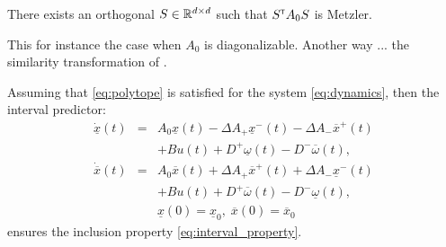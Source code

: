 \documentclass{article}
\begin{document}
\begin{assumption}
There exists an orthogonal $S\in\mathbb{R}^{d\times d}$ such that $S^{\mathsf{\scriptscriptstyle T}} A_0 S$ is Metzler.
\end{assumption}

This for instance the case when $A_0$ is diagonalizable. Another way ... the similarity transformation of \citep{Efimov_a2013}.

\begin{theorem}
\label{thm:predictor}
Assuming that \eqref{eq:polytope} is satisfied for the system \eqref{eq:dynamics}, then the interval predictor:
\begin{eqnarray}
\dot{\underline{x}}(t) & = & A_{0}\underline{x}(t)-\Delta A_{+}\underline{x}^{-}(t)-\Delta A_{-}\overline{x}^{+}(t)\nonumber \\
 &  & +Bu(t)+D^{+}\underline{\omega}(t)-D^{-}\overline{\omega}(t),\nonumber\\
\dot{\overline{x}}(t) & = & A_{0}\overline{x}(t)+\Delta A_{+}\overline{x}^{+}(t)+\Delta A_{-}\underline{x}^{-}(t) \label{eq:interval_predictor} \\
 &  & +Bu(t)+D^{+}\overline{\omega}(t)-D^{-}\underline{\omega}(t),\nonumber \\
 &  & \underline{x}(0)=\underline{x}_{0},\;\overline{x}(0)=\overline{x}_{0}\nonumber 
\end{eqnarray}
ensures the inclusion property \eqref{eq:interval_property}.


\end{theorem}
\end{document}
